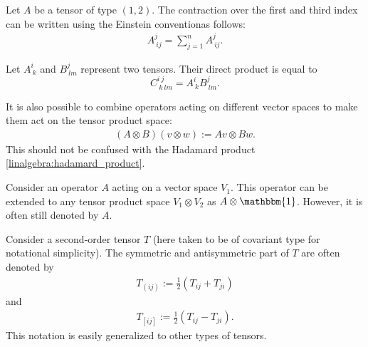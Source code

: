     \begin{example}
        Let $A$ be a tensor of type $(1,2)$. The contraction over the first and third index can be written using the Einstein conventionas follows:
        \begin{gather}
            A_{\ ij}^j = \sum_{j=1}^nA_{\ ij}^j.
        \end{gather}
    \end{example}

    \begin{example}
        Let $A_{\ k}^i$ and $B_{\ lm}^j$ represent two tensors. Their direct product is equal to \[C_{\ k\ lm}^{i\ j} = A_{\ k}^iB_{\ lm}^j.\]
    \end{example}
    \begin{example}\label{vector:operator_product}
        It is also possible to combine operators acting on different vector spaces to make them act on the tensor product space:
        \begin{gather}
            (A\otimes B)(v\otimes w) := Av\otimes Bw.
        \end{gather}
        This should not be confused with the Hadamard product \ref{linalgebra:hadamard_product}.
    \end{example}
    \begin{notation}\label{vector:tensor_abuse}
        Consider an operator $A$ acting on a vector space $V_1$. This operator can be extended to any tensor product space $V_1\otimes V_2$ as $A\otimes\mathbbm{1}$. However, it is often still denoted by $A$.
    \end{notation}

    \begin{notation}
        Consider a second-order tensor $T$ (here taken to be of covariant type for notational simplicity). The symmetric and antisymmetric part of $T$ are often denoted by
        \begin{gather}
            T_{(ij)} := \frac{1}{2}\left(T_{ij} + T_{ji}\right)
        \end{gather}
        and
        \begin{gather}
            T_{[ij]} := \frac{1}{2}\left(T_{ij} - T_{ji}\right).
        \end{gather}
        This notation is easily generalized to other types of tensors.
    \end{notation}

